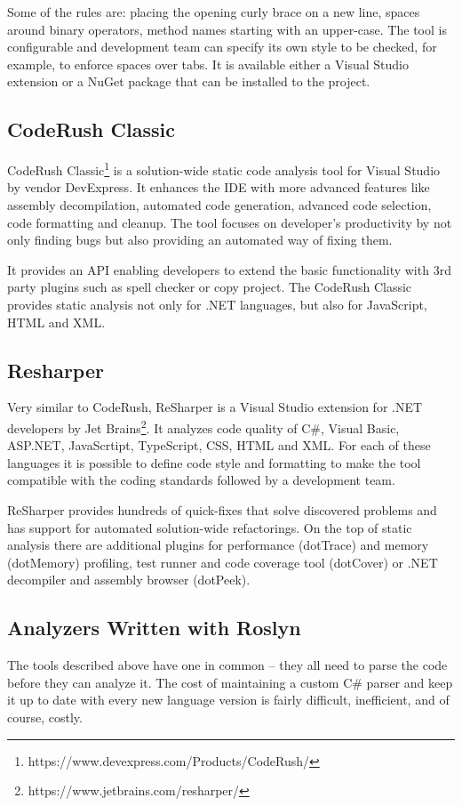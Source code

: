 \documentclass[
  digital, %
  table,   %
  lof,     %
  lot,     %
  oneside,
]{fithesis3}
\begin{document}
Some of the rules are: placing the opening curly brace on a new line, spaces around binary operators, method names starting with an upper-case. The tool is configurable and development team can specify its own style to be checked, for example, to enforce spaces over tabs. It is available either a Visual Studio extension or a NuGet package that can be installed to the project.

\subsection{CodeRush Classic}
CodeRush Classic\footnote{https://www.devexpress.com/Products/CodeRush/} is a solution-wide static code analysis tool for Visual Studio by vendor DevExpress. It enhances the IDE with more advanced features like assembly decompilation, automated code generation, advanced code selection, code formatting and cleanup. The tool focuses on developer's productivity by not only finding bugs but also providing an automated way of fixing them.

It provides an API enabling developers to extend the basic functionality with 3rd party plugins such as spell checker or copy project. The CodeRush Classic provides static analysis not only for .NET languages, but also for JavaScript, HTML and XML.

\subsection{Resharper}
Very similar to CodeRush, ReSharper is a Visual Studio extension for .NET developers by Jet Brains\footnote{https://www.jetbrains.com/resharper/}. It analyzes code quality of C\#, Visual Basic, ASP.NET, JavaScrtipt, TypeScript, CSS, HTML and XML. For each of these languages it is possible to define code style and formatting to make the tool compatible with the coding standards followed by a development team. 

ReSharper provides hundreds of quick-fixes that solve discovered problems and has support for automated solution-wide refactorings. On the top of static analysis there are additional plugins for performance (dotTrace) and memory (dotMemory) profiling, test runner and code coverage tool (dotCover) or .NET decompiler and assembly browser (dotPeek).


\subsection{Analyzers Written with Roslyn}
The tools described above have one in common -- they all need to parse the code before they can analyze it. The cost of maintaining a custom C\# parser and keep it up to date with every new language version is fairly difficult, inefficient, and of course, costly. 
\end{document}
